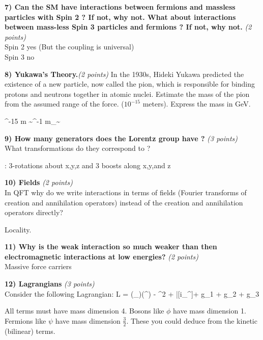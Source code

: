 {\textbf{7) Can the SM have interactions between fermions and massless particles with Spin 2 ? If not, why not.  What about interactions between mass-less Spin 3 particles and fermions ? If not, why not. }\hfill \textit{(2 points)}\\

\bc
Spin 2 yes (But the coupling is universal)\\
Spin 3 no
\ec

\textbf{8) Yukawa’s Theory.}\hfill \textit{(2 points)}
In the 1930s, Hideki Yukawa predicted the existence of a new particle, now called the pion, which is responsible for binding protons and neutrons together in atomic nuclei. 
Estimate the mass of the pion from the assumed range of the force. ($10^{-15}$ meters). 
Express the mass in GeV.

^{-15} m \sim \GeV^{-1} \Rightarrow m_\pi \sim  \GeV
\ee


\textbf{9)  How many generators does the Lorentz group have ? }\hfill \textit{(3 points)}\\
What transformations do they correspond to ?

:  3-rotations about x,y,z  and 3 boosts along x,y,and z
\ec


\textbf{10) Fields } \hfill \textit{(2 points)}\\
In QFT why do we write interactions in terms of fields (Fourier transforms of creation and annihilation operators)  instead  of the creation and annihilation operators directly?

\bc
Locality.
\ec


\textbf{11) Why is the weak interaction so much weaker than then electromagnetic interactions at low energies? } \hfill \textit{(2 points)}\\

\bc
Massive force carriers
\ec

\clearpage

\textbf{12) Lagrangians } \hfill \textit{(3 points)}\\
Consider the following Lagrangian:
\be
L =  (\partial_\mu\phi)(\partial^\mu\phi) - \phi^2 + \bar{\psi}[i\gamma_\mu\partial^\mu]\psi + g_1 \phi \psi \psi + g_2 \psi \psi \psi \psi + g_3 \phi \phi \phi \phi
\ee

\bc
All terms must have mass dimension 4. Bosons like $\phi$ have mass dimension 1. Fermions like $\psi$ have mass dimension $\frac{3}{2}$.  These you could deduce from the kinetic (bilinear) terms.
\ec

}

